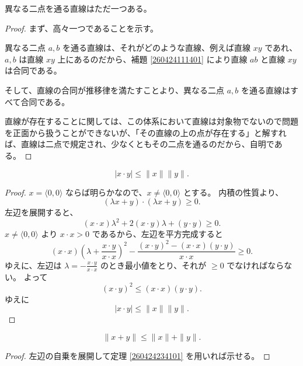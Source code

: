 
\begin{semi}[直線の唯一存在の公理]
  異なる二点を通る直線はただ一つある。
\end{semi}

\begin{proof}
  まず、高々一つであることを示す。

  異なる二点 \(a,b\) を通る直線は、それがどのような直線、例えば直線 \(xy\) であれ、\(a,b\) は直線 \(xy\) 上にあるのだから、補題 \ref{260424111401} により直線 \(ab\) と直線 \(xy\) は合同である。

  そして、直線の合同が推移律を満たすことより、異なる二点 \(a,b\) を通る直線はすべて合同である。

  直線が存在することに関しては、この体系において直線は対象物でないので問題を正面から扱うことができないが、「その直線の上の点が存在する」と解すれば、直線は二点で規定され、少なくともその二点を通るのだから、自明である。
\end{proof}


\begin{thm}\label{260424234101}
  \[|x\cdot y|\leq\|x\|\|y\|.\]
\end{thm}

\begin{proof}
  \(x=\langle0,0\rangle\) ならば明らかなので、\(x\neq\langle0,0\rangle\) とする。
  内積の性質より、
  \[(\lambda x+y)\cdot(\lambda x+y)\geq 0.\]
  左辺を展開すると、
  \[(x\cdot x)\lambda^2+2(x\cdot y)\lambda+(y\cdot y)\geq 0.\]
  \(x\neq\langle0,0\rangle\) より \(x\cdot x>0\) であるから、左辺を平方完成すると
  \[(x\cdot x)\left(\lambda+\frac{x\cdot y}{x\cdot x}\right)^2-\frac{(x\cdot y)^2-(x\cdot x)(y\cdot y)}{x\cdot x}\geq 0.\]
  ゆえに、左辺は \(\displaystyle \lambda=-\frac{x\cdot y}{x\cdot x}\) のとき最小値をとり、それが \(\geq 0\) でなければならない。
  よって
  \[(x\cdot y)^2\leq(x\cdot x)(y\cdot y).\]
  ゆえに
  \[|x\cdot y|\leq\|x\|\|y\|.\]
\end{proof}


\begin{lmm}\label{260424225402}
  \[\|x+y\|\leq\|x\|+\|y\|.\]
\end{lmm}

\begin{proof}
  左辺の自乗を展開して定理 \ref{260424234101} を用いれば示せる。
\end{proof}

